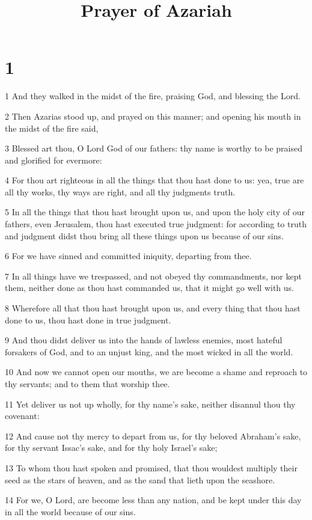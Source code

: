 

\title{Prayer of Azariah}


\chapter{1}

\par 1 And they walked in the midst of the fire, praising God, and blessing the Lord.
\par 2 Then Azarias stood up, and prayed on this manner; and opening his mouth in the midst of the fire said,
\par 3 Blessed art thou, O Lord God of our fathers: thy name is worthy to be praised and glorified for evermore:
\par 4 For thou art righteous in all the things that thou hast done to us: yea, true are all thy works, thy ways are right, and all thy judgments truth.
\par 5 In all the things that thou hast brought upon us, and upon the holy city of our fathers, even Jerusalem, thou hast executed true judgment: for according to truth and judgment didst thou bring all these things upon us because of our sins.
\par 6 For we have sinned and committed iniquity, departing from thee.
\par 7 In all things have we trespassed, and not obeyed thy commandments, nor kept them, neither done as thou hast commanded us, that it might go well with us.
\par 8 Wherefore all that thou hast brought upon us, and every thing that thou hast done to us, thou hast done in true judgment.
\par 9 And thou didst deliver us into the hands of lawless enemies, most hateful forsakers of God, and to an unjust king, and the most wicked in all the world.
\par 10 And now we cannot open our mouths, we are become a shame and reproach to thy servants; and to them that worship thee.
\par 11 Yet deliver us not up wholly, for thy name's sake, neither disannul thou thy covenant:
\par 12 And cause not thy mercy to depart from us, for thy beloved Abraham's sake, for thy servant Issac's sake, and for thy holy Israel's sake;
\par 13 To whom thou hast spoken and promised, that thou wouldest multiply their seed as the stars of heaven, and as the sand that lieth upon the seashore.
\par 14 For we, O Lord, are become less than any nation, and be kept under this day in all the world because of our sins.
